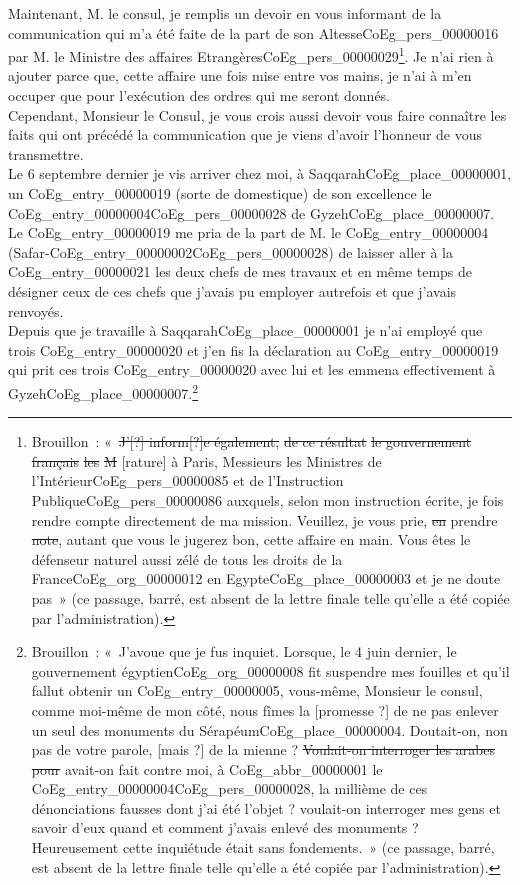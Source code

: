 \documentclass{book}
\begin{document}
\indent Maintenant, M. le consul, je remplis un devoir en vous informant de la communication qui m’a été faite de la part de son Altesse\gls{CoEg_pers_00000016} par M. le Ministre des affaires Etrangères\gls{CoEg_pers_00000029}\footnote{Brouillon~: «~\sout{J’[?] inform[?]e également,} \sout{de ce résultat} \sout{le gouvernement français} \sout{les} \sout{M} [rature] à Paris, Messieurs les Ministres de l’Intérieur\gls{CoEg_pers_00000085} et de l’Instruction Publique\gls{CoEg_pers_00000086} auxquels, selon mon instruction écrite, je fois rendre compte directement de ma mission. Veuillez, je vous prie, \sout{en} prendre \sout{note}, autant que vous le jugerez bon, cette affaire en main. Vous êtes le défenseur naturel aussi zélé de tous les droits de la France\gls{CoEg_org_00000012} en Egypte\gls{CoEg_place_00000003} et je ne doute pas~» (ce passage, barré, est absent de la lettre finale telle qu’elle a été copiée par l’administration).}. Je n’ai rien à ajouter parce que, cette affaire une fois mise entre vos mains, je n’ai à m’en occuper que pour l’exécution des ordres qui me seront donnés.\\
\indent Cependant, Monsieur le Consul, je vous crois aussi devoir vous faire connaître les faits qui ont précédé la communication que je viens d’avoir l’honneur de vous transmettre.\\
\indent Le 6 septembre dernier je vis arriver chez moi, à Saqqarah\gls{CoEg_place_00000001}, un \gls{CoEg_entry_00000019} (sorte de domestique) de son excellence le \Gls{CoEg_entry_00000004}\gls{CoEg_pers_00000028} de Gyzeh\gls{CoEg_place_00000007}. Le \gls{CoEg_entry_00000019}  me pria de la part de M. le \Gls{CoEg_entry_00000004} (Safar-\Gls{CoEg_entry_00000002}\gls{CoEg_pers_00000028}) de laisser aller à la \Gls{CoEg_entry_00000021} les deux chefs de mes travaux et en même temps de désigner ceux de ces chefs que j’avais pu employer autrefois et que j’avais renvoyés.\\
\indent Depuis que je travaille à Saqqarah\gls{CoEg_place_00000001} je n’ai employé que trois \gls{CoEg_entry_00000020} et j’en fis la déclaration au \gls{CoEg_entry_00000019} qui prit ces trois \gls{CoEg_entry_00000020} avec lui et les emmena effectivement à Gyzeh\gls{CoEg_place_00000007}.\footnote{Brouillon~: «~J’avoue que je fus inquiet. Lorsque, le 4 juin dernier, le gouvernement égyptien\gls{CoEg_org_00000008} fit suspendre mes fouilles et qu’il fallut obtenir un \gls{CoEg_entry_00000005}, vous-même, Monsieur le consul, comme moi-même de mon côté, nous fîmes la [promesse ?] de ne pas enlever un seul des monuments du Sérapéum\gls{CoEg_place_00000004}. Doutait-on, non pas de votre parole, [mais ?] de la mienne ? \sout{Voulait-on interroger les arabes pour} avait-on fait contre moi, à \gls{CoEg_abbr_00000001} le \gls{CoEg_entry_00000004}\gls{CoEg_pers_00000028}, la millième de ces dénonciations fausses dont j’ai été l’objet ? voulait-on interroger mes gens et savoir d’eux quand et comment j’avais enlevé des monuments ?\\
Heureusement cette inquiétude était sans fondements.~» (ce passage, barré, est absent de la lettre finale telle qu’elle a été copiée par l’administration).}\\
\end{document}
